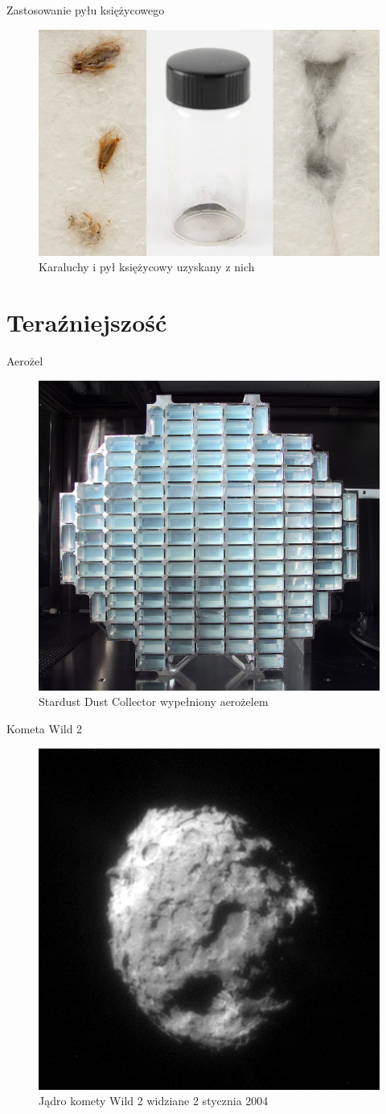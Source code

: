 \documentclass{beamer}
\begin{document}
\begin{frame}{Zastosowanie pyłu księżycowego}
    \begin{figure}
        \centering
        \includegraphics[width=0.75\linewidth]{kosmos/kara.png}
        \caption{Karaluchy i pył księżycowy uzyskany z nich}
    \end{figure}
\end{frame}

\section{Teraźniejszość}

\begin{frame}{Aerożel}
    \begin{figure}
        \centering
        \includegraphics[width=0.5\linewidth]{kosmos/gel.png}
        \caption{Stardust Dust Collector wypełniony aerożelem}
    \end{figure}
\end{frame}

\begin{frame}{Kometa Wild 2}
    \begin{figure}
        \centering
        \includegraphics[width=0.5\linewidth]{kosmos/wild.png}
        \caption{Jądro komety Wild 2 widziane 2 stycznia 2004}
    \end{figure}
\end{frame}
\end{document}
